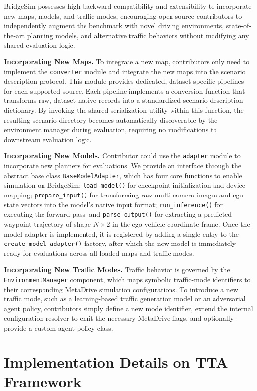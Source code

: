 \documentclass{article}
\begin{document}
BridgeSim possesses high backward-compatibility and extensibility to incorporate new maps, models, and traffic modes, encouraging open-source contributors to independently augment the benchmark with novel driving environments,
state-of-the-art planning models, and alternative traffic behaviors without
modifying any shared evaluation logic.

\textbf{Incorporating New Maps.} To integrate a new map, contributors only need to implement the \texttt{converter} module and integrate the new maps into the scenario description protocol. This module provides dedicated, dataset-specific pipelines for each supported source. Each pipeline implements a conversion function that transforms raw, dataset-native records into a standardized scenario description dictionary. By invoking the shared serialization utility within this function, the resulting scenario directory becomes automatically discoverable by the environment manager during evaluation, requiring no modifications to downstream evaluation logic.


\textbf{Incorporating New Models.}
Contributor could use the \texttt{adapter} module to incorporate new planners for evaluations. We provide an interface through the abstract base class
\texttt{BaseModelAdapter}, which has four core functions to enable simulation on BridgeSim:
\texttt{load\_model()} for checkpoint initialization and device mapping;
\texttt{prepare\_input()} for transforming raw multi-camera images and ego-state
vectors into the model's native input format;
\texttt{run\_inference()} for executing the forward pass; and
\texttt{parse\_output()} for extracting a predicted waypoint trajectory of shape
$N \times 2$ in the ego-vehicle coordinate frame. Once the model adapter is implemented, it is registered by adding a single entry
to the \texttt{create\_model\_adapter()} factory, after which the new model is
immediately ready for evaluations across all loaded maps and traffic modes.

\textbf{Incorporating New Traffic Modes.}
Traffic behavior is governed by the \texttt{EnvironmentManager} component, which maps symbolic traffic-mode identifiers to their corresponding MetaDrive simulation configurations. To introduce a new traffic mode, such as a learning-based traffic generation model or an adversarial agent policy, contributors simply define a new mode identifier, extend the internal configuration resolver to emit the necessary MetaDrive flags, and optionally provide a custom agent policy class.

\section{Implementation Details on TTA Framework}
\end{document}
